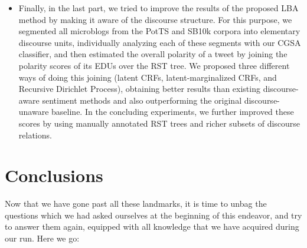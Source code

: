 \begin{itemize}
\item Finally, in the last part, we tried to improve the results of
  the proposed LBA method by making it aware of the discourse
  structure.  For this purpose, we segmented all microblogs from the
  PotTS and SB10k corpora into elementary discourse units,
  individually analyzing each of these segments with our CGSA
  classifier, and then estimated the overall polarity of a tweet by
  joining the polarity scores of its EDUs over the RST tree.  We
  proposed three different ways of doing this joining (latent CRFs,
  latent-marginalized CRFs, and Recursive Dirichlet Process),
  obtaining better results than existing discourse-aware sentiment
  methods and also outperforming the original discourse-unaware
  baseline.  In the concluding experiments, we further improved these
  scores by using manually annotated RST trees and richer subsets of
  discourse relations.
\end{itemize}


\section*{Conclusions}

Now that we have gone past all these landmarks, it is time to unbag
the questions which we had asked ourselves at the beginning of this
endeavor, and try to answer them again, equipped with all knowledge
that we have acquired during our run.  Here we go:

